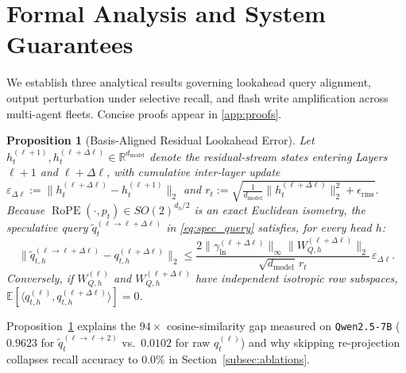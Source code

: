 \documentclass[final,5p,times,twocolumn]{elsarticle}
\newtheorem{proposition}{Proposition}
\theoremstyle{definition}
\theoremstyle{remark}
\newcommand{\RoPE}{\operatorname{RoPE}}
\newcommand{\R}{\mathbb{R}}
\newcommand{\E}{\mathbb{E}}
\begin{document}
\section{Formal Analysis and System Guarantees}\label{sec:theory}

We establish three analytical results governing lookahead query alignment, output perturbation under selective recall, and flash write amplification across multi-agent fleets. Concise proofs appear in \ref{app:proofs}.

\begin{proposition}[Basis-Aligned Residual Lookahead Error]\label{prop:lookahead}
Let $h_t^{(\ell+1)}, h_t^{(\ell+\Delta\ell)} \in \R^{d_{\mathrm{model}}}$ denote the residual-stream states entering Layers~$\ell+1$ and $\ell+\Delta\ell$, with cumulative inter-layer update $\varepsilon_{\Delta\ell} := \|h_t^{(\ell+\Delta\ell)} - h_t^{(\ell+1)}\|_2$ and $r_t := \sqrt{\frac{1}{d_{\mathrm{model}}}\|h_t^{(\ell+\Delta\ell)}\|_2^2 + \epsilon_{\mathrm{rms}}}$. Because $\RoPE(\cdot, p_t) \in SO(2)^{d_h/2}$ is an exact Euclidean isometry, the speculative query $\tilde{q}_t^{(\ell \to \ell+\Delta\ell)}$ in \eqref{eq:spec_query} satisfies, for every head $h$:
\begin{equation}\label{eq:prop1}
\big\|\tilde{q}_{t,h}^{(\ell \to \ell+\Delta\ell)} - q_{t,h}^{(\ell+\Delta\ell)}\big\|_2 \le \frac{2\|\gamma_{\mathrm{ln}}^{(\ell+\Delta\ell)}\|_\infty \|W_{Q,h}^{(\ell+\Delta\ell)}\|_2}{\sqrt{d_{\mathrm{model}}}\, r_t}\,\varepsilon_{\Delta\ell}.
\end{equation}
Conversely, if $W_{Q,h}^{(\ell)}$ and $W_{Q,h}^{(\ell+\Delta\ell)}$ have independent isotropic row subspaces, $\E[\langle q_{t,h}^{(\ell)}, q_{t,h}^{(\ell+\Delta\ell)}\rangle] = 0$.
\end{proposition}

Proposition~\ref{prop:lookahead} explains the $94\times$ cosine-similarity gap measured on \texttt{Qwen2.5-7B} ($0.9623$ for $\tilde{q}_t^{(\ell\to\ell+2)}$ vs.\ $0.0102$ for raw $q_t^{(\ell)}$) and why skipping re-projection collapses recall accuracy to $0.0\%$ in Section~\ref{subsec:ablations}.
\end{document}
